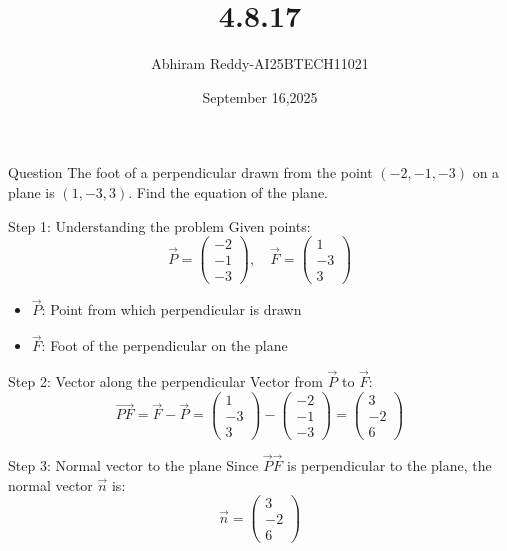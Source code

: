 \documentclass{beamer}
\title 
{4.8.17}
\date{September 16,2025}
\author 
{Abhiram Reddy-AI25BTECH11021}
\begin{document}
\frame{\titlepage}
\begin{frame}{Question}
    The foot of a perpendicular drawn from the point \((-2, -1, -3)\) on a plane is \((1, -3, 3)\). Find the equation of the plane.
\end{frame}

\begin{frame}{Step 1: Understanding the problem}
    Given points:
    \[
    \vec{P} = \begin{pmatrix} -2 \\ -1 \\ -3 \end{pmatrix}, \quad
    \vec{F} = \begin{pmatrix} 1 \\ -3 \\ 3 \end{pmatrix}
    \]
    \begin{itemize}
        \item \(\vec{P}\): Point from which perpendicular is drawn
        \item \(\vec{F}\): Foot of the perpendicular on the plane
    \end{itemize}
\end{frame}

\begin{frame}{Step 2: Vector along the perpendicular}
    Vector from \(\vec{P}\) to \(\vec{F}\):
    \[
    \vec{PF} = \vec{F} - \vec{P} = \begin{pmatrix} 1 \\ -3 \\ 3 \end{pmatrix} - \begin{pmatrix} -2 \\ -1 \\ -3 \end{pmatrix} = \begin{pmatrix} 3 \\ -2 \\ 6 \end{pmatrix}
    \]
\end{frame}

\begin{frame}{Step 3: Normal vector to the plane}
    Since \(\vec{P}\vec{F}\) is perpendicular to the plane, the normal vector \(\vec{n}\) is:
    \[
    \vec{n} = \begin{pmatrix} 3 \\ -2 \\ 6 \end{pmatrix}
    \]
\end{frame}
\end{document}
